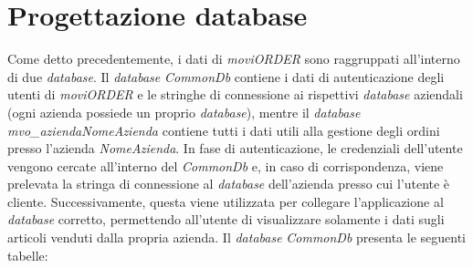 \section{Progettazione database} \label{progdb}

Come detto precedentemente, i dati di \textit{moviORDER} sono raggruppati all'interno di due \textit{database}. Il \textit{database} \textit{CommonDb} contiene i dati di autenticazione degli utenti di \textit{moviORDER} e le stringhe di connessione ai rispettivi \textit{database} aziendali (ogni azienda possiede un proprio \textit{database}), mentre il \textit{database} \textit{mvo\_aziendaNomeAzienda} contiene tutti i dati utili alla gestione degli ordini presso l'azienda \textit{NomeAzienda}. In fase di autenticazione, le credenziali dell'utente vengono cercate all'interno del \textit{CommonDb} e, in caso di corrispondenza, viene prelevata la stringa di connessione al \textit{database} dell'azienda presso cui l'utente è cliente. Successivamente, questa viene utilizzata per collegare l'applicazione al \textit{database} corretto, permettendo all'utente di visualizzare solamente i dati sugli articoli venduti dalla propria azienda.
Il \textit{database} \textit{CommonDb} presenta le seguenti tabelle:

